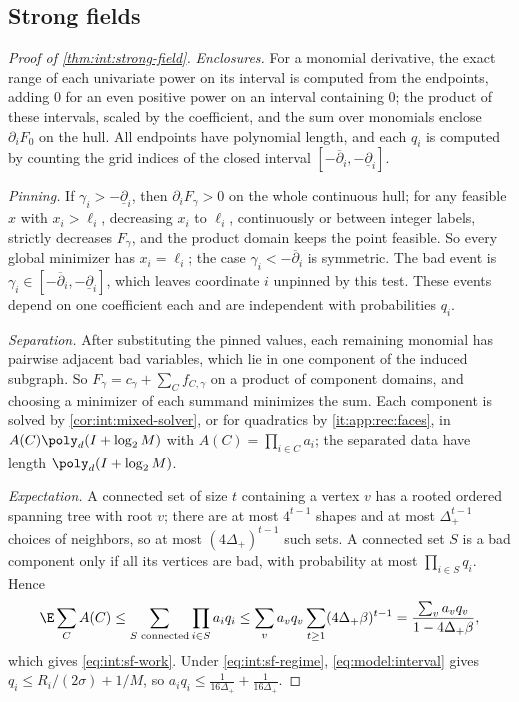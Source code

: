 \subsection{Strong fields}\label{app:int:strong-field}

\begin{proof}[Proof of \cref{thm:int:strong-field}]
\emph{Enclosures.} For a monomial derivative, the exact range of each univariate power
on its interval is computed from the endpoints, adding $0$ for an even positive power
on an interval containing $0$; the product of these intervals, scaled by the
coefficient, and the sum over monomials enclose $\partial_iF_0$ on the hull. All
endpoints have polynomial length, and each $q_i$ is computed by counting the grid
indices of the closed interval $[-\overline\partial_i,-\underline\partial_i]$.

\emph{Pinning.} If $\gamma_i>-\underline\partial_i$, then $\partial_iF_\gamma>0$ on the
whole continuous hull; for any feasible $x$ with $x_i>\ell_i$, decreasing $x_i$ to
$\ell_i$, continuously or between integer labels, strictly decreases $F_\gamma$, and the
product domain keeps the point feasible. So every global minimizer has $x_i=\ell_i$; the
case $\gamma_i<-\overline\partial_i$ is symmetric. The bad event is
$\gamma_i\in[-\overline\partial_i,-\underline\partial_i]$, which leaves
coordinate $i$ unpinned by this test. These events depend on one coefficient
each and are independent with probabilities $q_i$.

\emph{Separation.} After substituting the pinned values, each remaining monomial has
pairwise adjacent bad variables, which lie in one component of the induced subgraph.
So $F_\gamma=c_\gamma+\sum_Cf_{C,\gamma}$ on a product of component domains, and choosing
a minimizer of each summand minimizes the sum. Each component is solved by
\cref{cor:int:mixed-solver}, or for quadratics by \ref{it:app:rec:faces}, in
$A(C)\poly_d(I+\log_2M)$ with $A(C)=\prod_{i\in C}a_i$; the separated data have length
$\poly_d(I+\log_2M)$.

\emph{Expectation.} A connected set of size $t$ containing a vertex $v$ has a rooted
ordered spanning tree with root $v$; there are at most $4^{t-1}$ shapes and at most
$\Delta_+^{t-1}$ choices of neighbors, so at most $(4\Delta_+)^{t-1}$ such sets. A
connected set $S$ is a bad component only if all its vertices are bad, with probability
at most $\prod_{i\in S}q_i$. Hence
\[
 \E\sum_{C}A(C)\le\sum_{S\text{ connected}}\prod_{i\in S}a_iq_i
 \le\sum_va_vq_v\sum_{t\ge1}(4\Delta_+\beta)^{t-1}=\frac{\sum_va_vq_v}{1-4\Delta_+\beta},
\]
which gives \eqref{eq:int:sf-work}. Under \eqref{eq:int:sf-regime},
\eqref{eq:model:interval} gives $q_i\le R_i/(2\sigma)+1/M$, so
$a_iq_i\le\frac1{16\Delta_+}+\frac1{16\Delta_+}$.


\end{proof}
